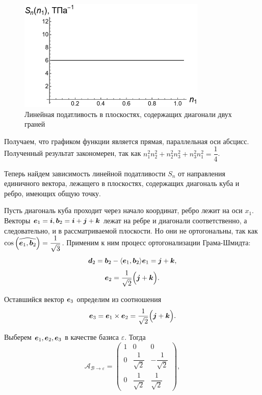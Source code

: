 \documentclass[12pt, a4paper]{article}
\renewcommand{\vec}[1]{\text{\mathversion{bold}${#1}$}}%
\begin{document}
\begin{figure}[!htbp]
	\centering
	\includegraphics[width=0.8\textwidth]{pic-5}%
	\caption{Линейная податливость в плоскостях, содержащих диагонали двух граней}
	\vspace*{-2mm}
	\label{lin-grani-2-kuba}
\end{figure}

 Получаем, что графиком функции является прямая, параллельная оси абсцисс. Полученный результат закономерен, так как $n_1^2 n_2^2 + n_2^2 n_3^2 + n_3^2 n_1^2 = \dfrac{1}{4}$.
 
 Теперь найдем зависимость линейной податливости $S_n$ от направления единичного вектора, лежащего в плоскостях, содержащих диагональ куба и ребро, имеющих общую точку.
 
  Пусть диагональ куба проходит через начало координат, ребро лежит на оси $x_1.$ Векторы $ \vec e_1 = \vec i, \vec b_2 = \vec i + \vec j + \vec k $ лежат на ребре и диагонали соответственно, а следовательно, и в рассматриваемой плоскости. Но они не ортогональны, так как $\cos{\Bigl( \widehat{\vec e_1, \vec b_2} \Bigr)} = \dfrac{1}{\sqrt 3}$. Применим к ним процесс ортогонализации Грама-Шмидта: 
 \[
 \vec d_2 = \vec b_2 - \langle \vec e_1, \vec b_2 \rangle \vec e_1 = \vec j + \vec k,
 \]
 \[
 \vec e_2 = \dfrac{1}{\sqrt 2}\Bigl(\vec j + \vec k \Bigr).	
 \]
 
 Оставшийся вектор $\vec e_3$ определим из соотношения 
 \[
 \vec e_3 = \vec e_1 \times \vec e_2 = \dfrac{1}{\sqrt 2}\Bigl(\vec j + \vec k\Bigr).	
 \]
 
 Выберем $\vec e_1, \vec e_2, \vec e_3 $ в качестве базиса $\mathcal \varepsilon$. Тогда 
 \[
 \mathcal A_{\mathcal B \rightarrow \mathcal \varepsilon} = \begin{pmatrix}
 	1 & 0 & 0 \\
 	0 & \dfrac{1}{\sqrt 2} & -\dfrac{1}{\sqrt 2} \\[1em]
 	0 & \dfrac{1}{\sqrt 2} & \dfrac{1}{\sqrt 2}	
 \end{pmatrix},
 \]
 
\end{document}
